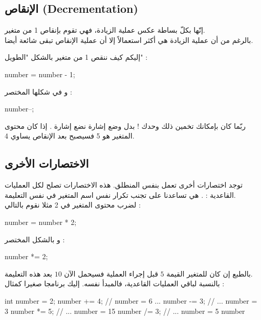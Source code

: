 \subsection{الإنقاص (\textenglish{Decrementation})}

إنّها بكلّ بساطة عكس عملية الزيادة، فهي تقوم بإنقاص 1 من متغير.\\
بالرغم من أن عملية الزيادة هي أكثر استعمالاً إلا أن عملية الإنقاص تبقى شائعة أيضا.

إليكم كيف ننقص 1 من متغير بالشكل "الطويل" :

\begin{Csource}
  number = number - 1;
\end{Csource}

و في شكلها المختصر :

\begin{Csource}
  number--;
\end{Csource}

ربّما كان بإمكانك تخمين ذلك وحدك ! بدل وضع إشارة
\InlineCode{++}
نضع إشارة
\InlineCode{{-}{-}}.
إذا كان محتوى المتغير هو 5 فسيصبح بعد الإنقاص يساوي 4.

\subsection{الاختصارات الأخرى}

توجد اختصارات أخرى تعمل بنفس المنطلق. هذه الاختصارات تصلح لكل العمليات القاعدية :
\InlineCode{+}
\InlineCode{-}
\InlineCode{*}
\InlineCode{/}
\InlineCode{\%}.
هي تساعدنا على تجنب تكرار نفس اسم المتغير في نفس التعليمة.\\
لضرب محتوى المتغير في 2 مثلا نقوم بالتالي :

\begin{Csource}
  number = number * 2;
\end{Csource}

و بالشكل المختصر :

\begin{Csource}
  number *= 2;
\end{Csource}

بالطبع إن كان للمتغير القيمة $ 5 $ قبل إجراء العملية فسيحمل الآن $ 10 $ بعد هذه التعليمة.\\
بالنسبة لباقي العمليات القاعدية، فالمبدأ نفسه. إليك برنامجا صغيرا كمثال :

\begin{Csource}
int number = 2;
number += 4; // number = 6 ...
number -= 3; // ... number = 3
number *= 5; // ... number = 15
number /= 3; // ... number = 5
number %
\end{Csource}

